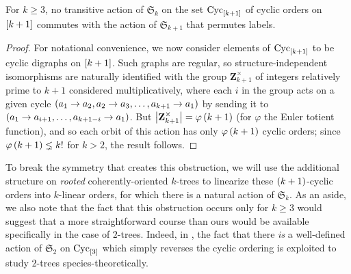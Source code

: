 \documentclass[sectionflow,singlespace,twoside,boldmathhdr]{brandiss} %
\numberwithin{section}{chapter}
\numberwithin{figure}{chapter}
\begin{document}
\begin{lemma}
  \label{lem:notransac}
  For $k \geq 3$, no transitive action of $\mathfrak{S}_{k}$ on the set $\operatorname{Cyc}_{\left[ {k+1} \right]}$ of cyclic orders on $\left[ {k+1} \right]$ commutes with the action of $\mathfrak{S}_{k+1}$ that permutes labels.
\end{lemma}
\begin{proof}
  For notational convenience, we now consider elements of $\operatorname{Cyc}_{\left[ {k+1} \right]}$ to be cyclic digraphs on $\left[ {k+1} \right]$.
  Such graphs are regular, so structure-independent isomorphisms are naturally identified with the group $\mathbf{Z}_{k+1}^{\times}$ of integers relatively prime to $k+1$ considered multiplicatively, where each $i$ in the group acts on a given cycle $\left( {a_{1} \to a_{2}, a_{2} \to a_{3}, \dots, a_{k+1} \to a_{1}} \right)$ by sending it to $\left( {a_{1} \to a_{i+1}, \dots, a_{k+1-i} \to a_{1}} \right)$.
  But $\left\vert {\mathbf{Z}_{k+1}^{\times}} \right\vert = \varphi \left( {k+1} \right)$ (for $\varphi$ the Euler totient function), and so each orbit of this action has only $\varphi \left( {k+1} \right)$ cyclic orders; since $\varphi \left( {k+1} \right) \lneq k!$ for $k > 2$, the result follows.
\end{proof}
To break the symmetry that creates this obstruction, we will use the additional structure on \emph{rooted} coherently-oriented $k$-trees to linearize these $\left( {k+1} \right)$-cyclic orders into $k$-linear orders, for which there is a natural action of $\mathfrak{S}_{k}$.
As an aside, we also note that the fact that this obstruction occurs only for $k \geq 3$ would suggest that a more straightforward course than ours would be available specifically in the case of $2$-trees.
Indeed, in \cite{gessel:spec2trees}, the fact that there \emph{is} a well-defined action of $\mathfrak{S}_{2}$ on $\operatorname{Cyc}_{\left[ {3} \right]}$ which simply reverses the cyclic ordering is exploited to study $2$-trees species-theoretically.
\end{document}
